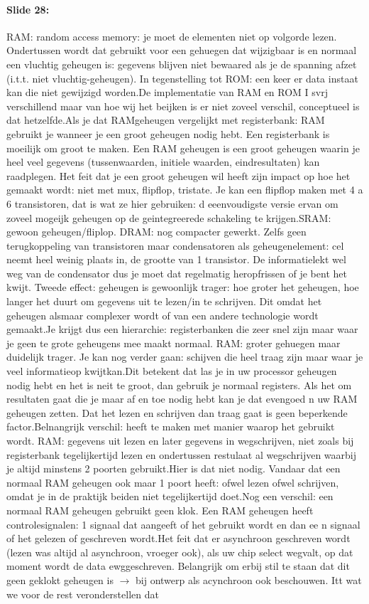 \documentclass[10pt,a4paper]{book}
\begin{document}
\paragraph{Slide 28:} RAM: random access memory: je moet de elementen niet op volgorde lezen. Ondertussen wordt dat gebruikt voor een gehuegen dat wijzigbaar is en normaal een vluchtig geheugen is: gegevens blijven niet bewaared als je de spanning afzet (i.t.t. niet vluchtig-geheugen). In tegenstelling tot ROM: een keer er data instaat kan die niet gewijzigd worden.De implementatie van RAM en ROM I svrj verschillend maar van hoe wij het beijken is er niet zoveel verschil, conceptueel is dat hetzelfde.Als je dat RAMgeheugen vergelijkt met registerbank: RAM gebruikt je wanneer je een groot geheugen nodig hebt. Een registerbank is moeilijk om groot te maken. Een RAM geheugen is een groot geheugen waarin je heel veel gegevens (tussenwaarden, initiele waarden, eindresultaten) kan raadplegen. Het feit dat je een groot geheugen wil heeft zijn impact op hoe het gemaakt wordt: niet met mux, flipflop, tristate. Je kan een flipflop maken met 4 a 6 transistoren, dat is wat ze hier gebruiken: d eeenvoudigste versie ervan om zoveel mogeijk geheugen op de geintegreerede schakeling te krijgen.SRAM: gewoon geheugen/fliplop. DRAM: nog compacter gewerkt. Zelfs geen terugkoppeling van transistoren maar condensatoren als geheugenelement: cel neemt heel weinig plaats in, de grootte van 1 transistor. De informatielekt wel weg van de condensator dus je moet dat regelmatig heropfrissen of je bent het kwijt. Tweede effect: geheugen is gewoonlijk trager: hoe groter het geheugen, hoe langer het duurt om gegevens uit te lezen/in te schrijven. Dit omdat het geheugen alsmaar complexer wordt of van een andere technologie wordt gemaakt.Je krijgt dus een hierarchie: registerbanken die zeer snel zijn maar waar je geen te grote geheugens mee maakt normaal. RAM: groter gehuegen maar duidelijk trager. Je kan nog verder gaan: schijven die heel traag zijn maar waar je veel informatieop kwijtkan.Dit betekent dat las je in uw processor geheugen nodig hebt en het is neit te groot, dan gebruik je normaal registers. Als het om resultaten gaat die je maar af en toe nodig hebt kan je dat evengoed n uw RAM geheugen zetten. Dat het lezen en schrijven dan traag gaat is geen beperkende factor.Belnangrijk verschil: heeft te maken met manier waarop het gebruikt wordt. RAM: gegevens uit lezen en later gegevens in wegschrijven, niet zoals bij registerbank tegelijkertijd lezen en ondertussen restulaat al wegschrijven waarbij je altijd minstens 2 poorten gebruikt.Hier is dat niet nodig. Vandaar dat een normaal RAM geheugen ook maar 1 poort heeft: ofwel lezen ofwel schrijven, omdat je in de praktijk beiden niet tegelijkertijd doet.Nog een verschil: een normaal RAM geheugen gebruikt geen klok. Een RAM geheugen heeft controlesignalen: 1 signaal dat aangeeft of het gebruikt wordt en dan ee n signaal of het gelezen of geschreven wordt.Het feit dat er asynchroon geschreven wordt (lezen was altijd al asynchroon, vroeger ook), als uw chip select wegvalt, op dat moment wordt de data ewggeschreven. Belangrijk om erbij stil te staan dat dit geen geklokt geheugen is $\rightarrow$ bij ontwerp als acynchroon ook beschouwen. Itt wat we voor de rest veronderstellen dat 
\end{document}
